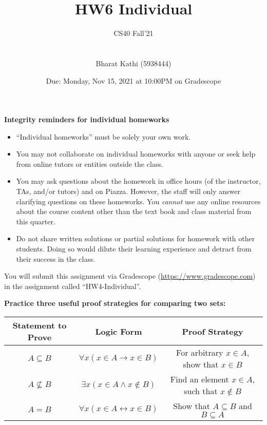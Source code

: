 \documentclass[12pt, oneside]{article}
\title{HW6 Individual}
\author{CS40 Fall'21\\\\\\
Bharat Kathi (5938444)}
\date{Due: Monday, Nov 15, 2021 at 10:00PM on Gradescope}
\begin{document}
\maketitle

{\bf Integrity reminders for individual homeworks}
\begin{itemize}
\item ``Individual homeworks'' must be solely your own work. 
\item You may not collaborate on individual homeworks with anyone or seek help from online tutors or entities outside the class.
\item You may ask questions about the homework in office hours (of the instructor, TAs, and/or tutors) and 
on Piazza.  However, the staff will only answer clarifying questions on these homeworks. You \emph{cannot} use any online resources about the course content other than the text
book and class material from this quarter.
\item Do not share written solutions or partial solutions for homework with other students. Doing so would dilute their learning experience and detract from their success in the class.
\end{itemize}

You will submit this assignment via Gradescope
(\href{https://www.gradescope.com}{https://www.gradescope.com}) in the assignment called ``HW4-Individual''.

\newpage

{\bf Practice three useful proof strategies for comparing two sets:}

\begin{center}
\begin{tabular}{c|c|c}
{\bf  Statement to Prove} & {\bf Logic Form} &{\bf Proof Strategy}\\
\hline 
$A \subseteq B$ & $\forall x  (x \in A  \to x  \in B)$ &For arbitrary $x \in A$, show that $x \in B$ \\
$A \nsubseteq B$ &$\exists x  (x \in A  \land x  \notin B) $ & Find an element $x \in A$, such that $x \notin B$ \\
$A = B$ & $\forall x  ( x\in A \leftrightarrow x \in B)$ & Show that $A \subseteq B$ and $B \subseteq A$ \\
\end{tabular}
\end{center}
\end{document}
